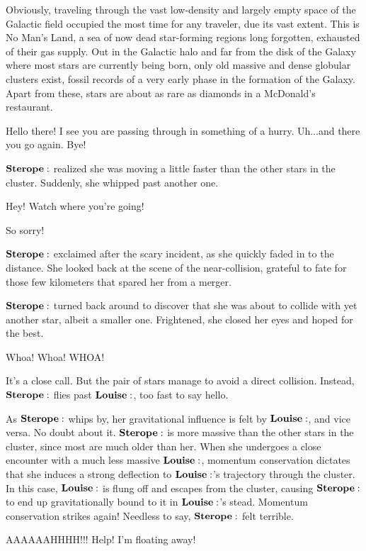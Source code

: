 Obviously, traveling through the vast low-density and largely empty space of the Galactic field occupied the most time for any traveler, due its vast extent.  This is No Man's Land, a sea of now dead star-forming regions long forgotten, exhausted of their gas supply.  Out in the Galactic halo and far from the disk of the Galaxy where most stars are currently being born, only old massive and dense globular clusters exist, fossil records of a very early phase in the formation of the Galaxy.  Apart from these, stars are about as rare as diamonds in a McDonald's restaurant. 

\Jane Hello there!  I see you are passing through in something of a hurry.  Uh...and there you go again.  Bye!

$\Sterope$ realized she was moving a little faster than the other stars in the cluster.  Suddenly, she whipped past another one.

\Dan Hey!  Watch where you're going!

\Sterope So sorry!

$\Sterope$ exclaimed after the scary incident, as she quickly faded in to the distance.  She looked back at the scene of the near-collision, grateful to fate for those few kilometers that spared her from a merger.


$\Sterope$ turned back around to discover that she was about to collide with yet another star, albeit a smaller one.  Frightened, she closed her eyes and hoped for the best.  

\Louise Whoa! Whoa! WHOA!

It's a close call.  But the pair of stars manage to avoid a direct collision.  Instead, $\Sterope$ flies past $\Louise$, too fast to say hello.

As $\Sterope$ whips by, her gravitational influence is felt by $\Louise$, and vice versa.  No doubt about it.  $\Sterope$ is more massive than the other stars in the cluster, since most are much older than her.  When she undergoes a close encounter with a much less massive $\Louise$, momentum conservation dictates that she induces a strong deflection to $\Louise$'s trajectory through the cluster.  In this case, $\Louise$ is flung off and escapes from the cluster, causing $\Sterope$ to end up gravitationally bound to it in $\Louise$'s stead.  Momentum conservation strikes again!  Needless to say, $\Sterope$ felt terrible.

\Louise  AAAAAAHHHH!!! Help!  I'm floating away!

